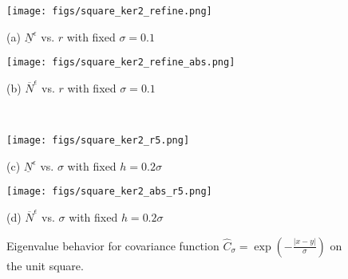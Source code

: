 \documentclass[11pt]{amsart}
\begin{document}
\begin{figure}[!htb]
	\begin{center}
		\hspace{-0.6cm}
		\begin{minipage}{0.46\textwidth}
			\texttt{[image: figs/square\_ker2\_refine.png]}
			\caption*{(a) $\underline{N}^{\epsilon}$ vs. $r$ with fixed $\sigma=0.1$}
		\end{minipage}
		\hfil
		\begin{minipage}{0.46\textwidth}
			\texttt{[image: figs/square\_ker2\_refine\_abs.png]}
			\caption*{(b) $\overline{N}^{\epsilon}$ vs. $r$ with fixed $\sigma=0.1$}
		\end{minipage}
		\\
		\vspace{0.3cm}
		\hspace{-0.6cm}
		\begin{minipage}{0.46\textwidth}
			\texttt{[image: figs/square\_ker2\_r5.png]}
			\caption*{(c) $\underline{N}^{\epsilon}$ vs. $\sigma$ with fixed $h=0.2\sigma$}
		\end{minipage}
		\hfil
		\begin{minipage}{0.46\textwidth}
			\texttt{[image: figs/square\_ker2\_abs\_r5.png]}
			\caption*{(d) $\overline{N}^{\epsilon}$ vs. $\sigma$ with fixed $h=0.2\sigma$}
		\end{minipage}
		\caption{Eigenvalue behavior for covariance function $\hat{C}_{\sigma}=\exp(-\frac{|x-y|}{\sigma})$ on the unit square.}
		\label{fig:square-ker2}
	\end{center}
\end{figure}
\end{document}
